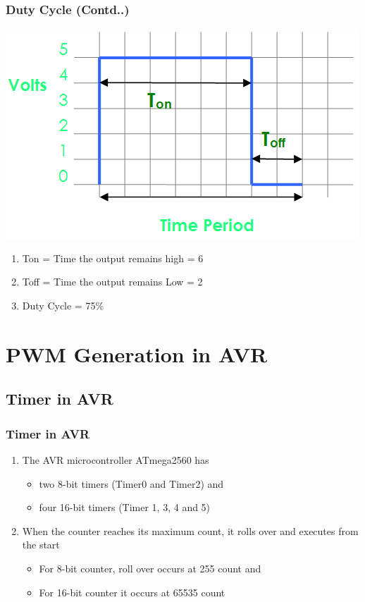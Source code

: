 \documentclass[10pt,red]{beamer}
\begin{document}
\begin{frame}[shrink = 2]
	\frametitle{Duty Cycle (Contd..)} \pause
		\includegraphics[width = \linewidth]{75_dutycycle} \pause
			\begin{enumerate}[$\checkmark$]
				\item<+-|alert@+> Ton = Time the output remains high = 6
			 	\item<+-|alert@+> Toff = Time the output remains Low = 2
			 	\item<+-|alert@+> Duty Cycle = 75\%
			\end{enumerate}
\end{frame}


\section{PWM Generation in AVR}
\subsection{Timer in AVR}
\begin{frame}
	\frametitle{Timer in AVR} \pause
		\begin{enumerate}
		\item<+-|alert@+> The AVR microcontroller ATmega2560 has \\[10pt]
			\begin{itemize}[$\checkmark$]
				\item<+-|alert@+> two 8-bit timers (Timer0 and Timer2) and \\[10pt]
				\item<+-|alert@+> four 16-bit timers (Timer 1, 3, 4 and 5) \\[10pt]
			\end{itemize}
			
		\item<+-|alert@+>When the counter reaches its maximum count, it rolls over and executes from the start \\[10pt]
			\begin{itemize}[$\checkmark$]
				\item<+-|alert@+> For 8-bit counter, roll over occurs at 255 count and \\[10pt]
				\item<+-|alert@+> For 16-bit counter it occurs at 65535 count \\[10pt]
			\end{itemize}
		\end{enumerate}
\end{frame}
\end{document}
